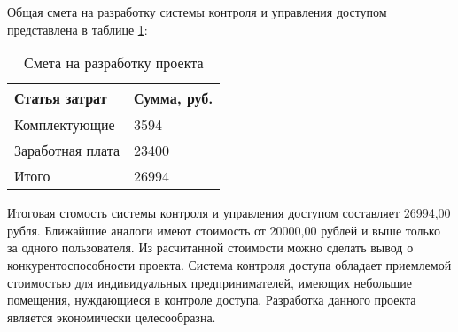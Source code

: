Общая смета на разработку системы контроля и управления доступом представлена
в таблице \ref{counts}:

\begin{table}[H]
  \caption{Смета на разработку проекта}\label{counts}
  \begin{tabularx}{\textwidth}{|X|l|}
  \hline Статья затрат & Сумма, руб. 
  \tabularnewline
  \hline Комплектующие & 3594 
  \tabularnewline
  \hline Заработная плата & 23400 
  \tabularnewline
  \hline Итого & 26994 
  \tabularnewline
  \hline 
  \end{tabularx}
\end{table}

Итоговая стомость системы контроля и управления доступом составляет 26994,00
рубля. Ближайшие аналоги имеют стоимость от 20000,00 рублей и выше только за одного
пользователя. Из расчитанной стоимости можно сделать вывод
о конкурентоспособности проекта. Система контроля доступа обладает приемлемой
стоимостью для индивидуальных предпринимателей, имеющих небольшие помещения,
нуждающиеся в контроле доступа. Разработка данного проекта является
экономически целесообразна. 
